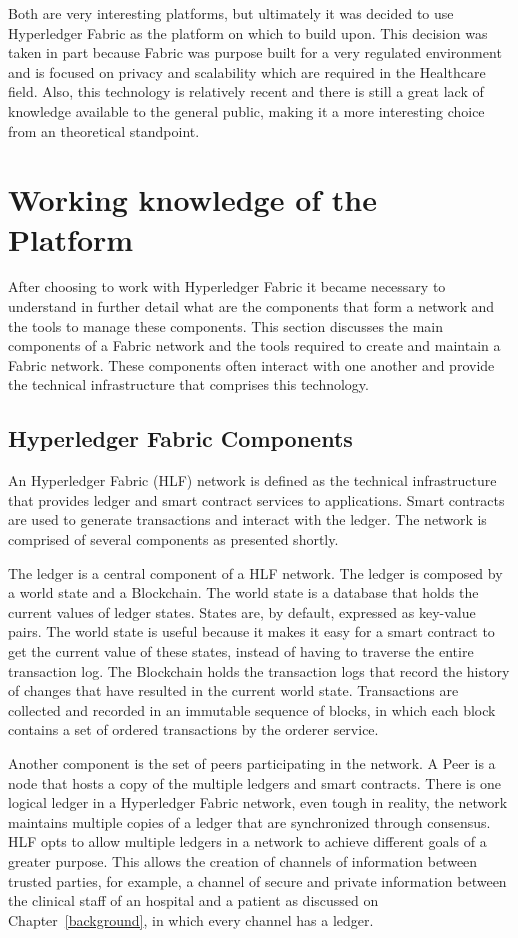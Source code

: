 Both are very interesting platforms, but ultimately it was decided to use
Hyperledger Fabric as the platform on which to build upon. This decision was
taken in part because Fabric was purpose built for a very regulated environment
and is focused on privacy and scalability which are required in the Healthcare
field. Also, this technology is relatively recent and there is still a great
lack of knowledge available to the general public, making it a more interesting
choice from an theoretical standpoint.


\section{Working knowledge of the Platform}

After choosing to work with Hyperledger Fabric it became necessary to
understand in further detail what are the components that form a network and
the tools to manage these components. This section discusses the main
components of a Fabric network and the tools required to create and maintain a
Fabric network. These components often interact with one another and provide
the technical infrastructure that comprises this technology.

\subsection{Hyperledger Fabric Components}

An Hyperledger Fabric (HLF) network is defined as the technical infrastructure
that provides ledger and smart contract services to applications. Smart
contracts are used to generate transactions and interact with the ledger. The
network is comprised of several components as presented shortly.

The ledger is a central component of a HLF network. The ledger is composed by a
world state and a Blockchain. The world state is a database that holds the
current values of ledger states. States are, by default, expressed as key-value
pairs. The world state is useful because it makes it easy for a smart contract
to get the current value of these states, instead of having to traverse the
entire transaction log. The Blockchain holds the transaction logs that record
the history of changes that have resulted in the current world state.
Transactions are collected and recorded in an immutable sequence of blocks, in
which each block contains a set of ordered transactions by the orderer service.

Another component is the set of peers participating in the network. A Peer is a
node that hosts a copy of the multiple ledgers and smart contracts. There is
one logical ledger in a Hyperledger Fabric network, even tough in reality, the
network maintains multiple copies of a ledger that are synchronized through
consensus. HLF opts to allow multiple ledgers in a network to achieve different
goals of a greater purpose. This allows the creation of channels of information
between trusted parties, for example, a channel of secure and private
information between the clinical staff of an hospital and a patient as
discussed on Chapter~\ref{background}, in which every channel has a ledger.

